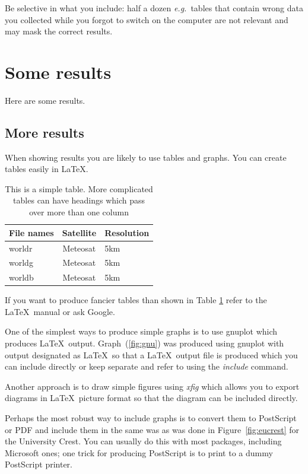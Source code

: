 \documentclass[12pt,a4paper]{report}
\begin{document}
Be selective in what you include: half a dozen \emph{e.g.}~tables that
contain wrong data you collected while you forgot to switch on the
computer are not relevant and may mask the correct results.


\section{Some results}
Here are some results.

\subsection{More results}
When showing results you are likely to use tables and graphs. You can
create tables easily in \LaTeX.

\begin{table}[h]
\begin{center}
\begin{tabular}{||l|c|l||}
\hline
\textbf{File names} & \textbf{Satellite} & \textbf{Resolution}\\
\hline
  worldr            &  Meteosat          &   5km\\
  worldg            &  Meteosat          &   5km\\
  worldb            &  Meteosat          &   5km\\
\hline
\end{tabular}
\end{center}
\caption{This is a simple table. More complicated tables can have
headings which pass over more than one column}
\label{simple_table}
\end{table}

If you want to produce fancier tables than shown in Table \ref{simple_table}
refer to the \LaTeX\ manual or ask Google.

One of the simplest ways to produce simple graphs is to use gnuplot
which produces \LaTeX\  output. Graph~(\ref{fig:gnu}) was produced using
gnuplot with output designated as \LaTeX\  so that a \LaTeX\  output file is
produced which you can include directly or keep separate and refer to
using the \emph{include} command.

Another approach is to draw simple figures using \emph{xfig} which allows
you to export diagrams in \LaTeX\  picture format so that the diagram can
be included directly.

Perhaps the most robust way to include graphs is to convert them to
PostScript or PDF and include them in the same was as was done in
Figure~\ref{fig:eucrest} for the University Crest. You can usually do
this with most packages, including Microsoft ones; one trick for
producing PostScript is to print to a dummy PostScript printer.
\end{document}
